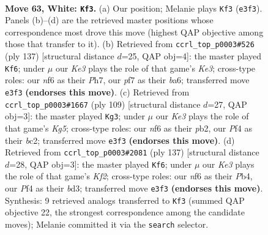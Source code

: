 \documentclass[11pt]{article}
\begin{document}
\clearpage

\begin{figure}[p]\centering
\begin{subfigure}{0.46\textwidth}\centering
\resizebox{\linewidth}{!}{%
\newchessgame
\chessboard[
  setfen={7k/5p2/5n2/3r4/pB3P1p/P3K2P/7R/8 w - - 1 63},
  showmover=false,
  pgfstyle=straightmove, color=movearrow, markmove={e3-f3}
]}
\caption{}
\end{subfigure}\hfill
\begin{subfigure}{0.46\textwidth}\centering
\resizebox{\linewidth}{!}{%
\newchessgame
\chessboard[
  setfen={3R4/2r4p/Bp2k3/2b2p1P/P1P2P2/8/6K1/8 b - - 58 69},
  showmover=false,
  pgfstyle=straightmove, color=movearrow, markmove={e6-f6}
]}
\caption{}
\end{subfigure}
\\[4pt]
\begin{subfigure}{0.46\textwidth}\centering
\resizebox{\linewidth}{!}{%
\newchessgame
\chessboard[
  setfen={8/5R2/p2p4/P1b5/1pP3k1/8/KPB5/4r3 b - - 0 55},
  showmover=false,
  pgfstyle=straightmove, color=movearrow, markmove={g4-g3}
]}
\caption{}
\end{subfigure}\hfill
\begin{subfigure}{0.46\textwidth}\centering
\resizebox{\linewidth}{!}{%
\newchessgame
\chessboard[
  setfen={1r6/2R2k2/3p4/3Pb3/1p3p2/3B3p/5P1K/8 b - - 0 69},
  showmover=false,
  pgfstyle=straightmove, color=movearrow, markmove={f7-f6}
]}
\caption{}
\end{subfigure}
\caption{\textbf{Move 63, White: \texttt{Kf3}.} (a) Our position; Melanie plays \texttt{Kf3} (\texttt{e3f3}). Panels (b)--(d) are the retrieved master positions whose correspondence most drove this move (highest QAP objective among those that transfer to it). (b) Retrieved from \texttt{ccrl\_top\_p0003\#526} (ply 137) [structural distance $d$=25, QAP obj=4]: the master played \texttt{Kf6}; under $\mu$ our \emph{Ke3} plays the role of that game's \emph{Ke3}; cross-type roles: our \emph{n}f6 as their \emph{P}h7, our \emph{p}f7 as their \emph{b}a6; transferred move \texttt{e3f3} \textbf{(endorses this move)}. (c) Retrieved from \texttt{ccrl\_top\_p0003\#1667} (ply 109) [structural distance $d$=27, QAP obj=3]: the master played \texttt{Kg3}; under $\mu$ our \emph{Ke3} plays the role of that game's \emph{Kg5}; cross-type roles: our \emph{n}f6 as their \emph{p}b2, our \emph{P}f4 as their \emph{b}c2; transferred move \texttt{e3f3} \textbf{(endorses this move)}. (d) Retrieved from \texttt{ccrl\_top\_p0003\#2081} (ply 137) [structural distance $d$=28, QAP obj=3]: the master played \texttt{Kf6}; under $\mu$ our \emph{Ke3} plays the role of that game's \emph{Kf2}; cross-type roles: our \emph{n}f6 as their \emph{P}b4, our \emph{P}f4 as their \emph{b}d3; transferred move \texttt{e3f3} \textbf{(endorses this move)}. Synthesis: 9 retrieved analogs transferred to \texttt{Kf3} (summed QAP objective 22, the strongest correspondence among the candidate moves); Melanie committed it via the \texttt{search} selector.}
\label{fig:thought-m124}
\end{figure}
\end{document}

